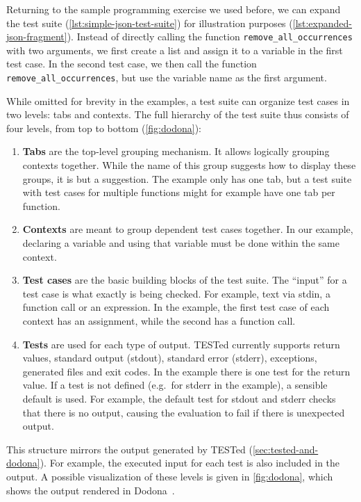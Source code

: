 \documentclass[../main]{subfiles}
\begin{document}
Returning to the sample programming exercise we used before, we can expand the test suite (\vref{lst:simple-json-test-suite}) for illustration purposes (\cref{lst:expanded-json-fragment}).
Instead of directly calling the function \texttt{remove_all_occurrences} with two arguments, we first create a list and assign it to a variable in the first test case.
In the second test case, we then call the function \texttt{remove_all_occurrences}, but use the variable name as the first argument.

While omitted for brevity in the examples, a test suite can organize test cases in two levels: tabs and contexts.
The full hierarchy of the test suite thus consists of four levels, from top to bottom (\vref{fig:dodona}):

\begin{enumerate}
    \item \textbf{Tabs} are the top-level grouping mechanism.
          It allows logically grouping contexts together.
          While the name of this group suggests how to display these groups, it is but a suggestion.
          The example only has one tab, but a test suite with test cases for multiple functions might for example have one tab per function.
    \item \textbf{Contexts} are meant to group dependent test cases together.
          In our example, declaring a variable and using that variable must be done within the same context.
    \item \textbf{Test cases} are the basic building blocks of the test suite.
          The ``input'' for a test case is what exactly is being checked.
          For example, text via stdin, a function call or an expression.
          In the example, the first test case of each context has an assignment, while the second has a function call.
    \item \textbf{Tests} are used for each type of output.
          TESTed currently supports return values, standard output (stdout), standard error (stderr), exceptions, generated files and exit codes.
          In the example there is one test for the return value.
          If a test is not defined (e.g.\ for stderr in the example), a sensible default is used.
          For example, the default test for stdout and stderr checks that there is no output, causing the evaluation to fail if there is unexpected output.
\end{enumerate}

This structure mirrors the output generated by TESTed (\vref{sec:tested-and-dodona}).
For example, the executed input for each test is also included in the output.
A possible visualization of these levels is given in \vref{fig:dodona}, which shows the output rendered in Dodona~\autocite{vanpetegemDodonaLearnCode2023}.
\end{document}
